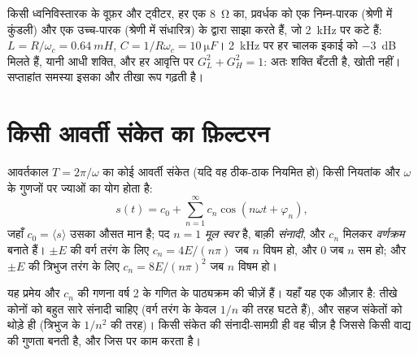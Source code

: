 \begin{example}[एक क्रॉसओवर]\label{ex:b1:filters-transfer-functions:crossover}
किसी ध्वनिविस्तारक के वूफ़र और ट्वीटर, हर एक \qty{8}{\ohm} का, प्रवर्धक को
एक निम्न-पारक (श्रेणी में कुंडली) और एक उच्च-पारक (श्रेणी में
संधारित्र) के द्वारा साझा करते हैं, जो \qty{2}{kHz} पर कटे हैं: $L = R/\omega_c = \qty{0.64}{mH}$,
$C = 1/R\omega_c = \qty{10}{\micro F}$। \qty{2}{kHz} पर हर चालक इकाई को
\qty{-3}{dB} मिलते हैं, यानी आधी शक्ति, और हर आवृत्ति पर $G_L^2 + G_H^2 = 1$:
अतः शक्ति बँटती है, खोती नहीं। सप्ताहांत समस्या इसका और तीखा रूप गढ़ती है।
\end{example}

\section{किसी आवर्ती संकेत का फ़िल्टरन}

\begin{theorem}[फूरिये वियोजन]\label{thm:b1:filters-transfer-functions:fourier}
आवर्तकाल $T = 2\pi/\omega$ का कोई आवर्ती संकेत (यदि वह ठीक-ठाक नियमित हो)
किसी नियतांक और $\omega$ के गुणजों पर ज्याओं का योग होता है:
\[
s(t) = c_0 + \sum_{n = 1}^{\infty} c_n\cos(n\omega t + \varphi_n),
\]
जहाँ $c_0 = \langle s\rangle$ उसका औसत मान है; पद $n = 1$
\emph{मूल स्वर} है, बाक़ी \emph{संनादी}, और
 $c_n$ मिलकर \emph{वर्णक्रम} बनाते हैं। 
$\pm E$ की वर्ग तरंग के लिए $c_n = 4E/(n\pi)$ जब $n$ विषम हो, और $0$ जब $n$
सम हो; और  $\pm E$ की त्रिभुज तरंग के लिए $c_n = 8E/(n\pi)^2$ जब $n$
विषम हो।
\end{theorem}
\admitted

\begin{remark}[इससे क्या लेना है]\label{rem:b1:filters-transfer-functions:fourier}
यह प्रमेय और $c_n$ की गणना वर्ष 2 के गणित के
पाठ्यक्रम की चीज़ें हैं। यहाँ यह एक औज़ार है: तीखे कोनों को बहुत सारे
संनादी चाहिए (वर्ग तरंग के केवल $1/n$ की तरह घटते हैं), और सहज संकेतों को
थोड़े ही (त्रिभुज के $1/n^2$ की तरह)। किसी संकेत की संनादी-सामग्री ही वह चीज़ है
जिससे किसी वाद्य की गुणता बनती है, और जिस पर  काम करता है।
\end{remark}

